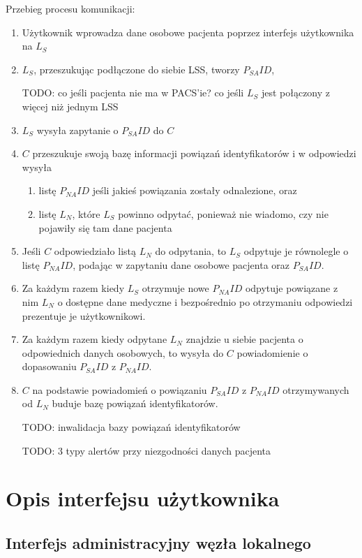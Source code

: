 \documentclass[a4paper]{report}
\begin{document}
Przebieg procesu komunikacji:
\begin{enumerate}
  \item Użytkownik wprowadza dane osobowe pacjenta poprzez interfejs użytkownika na $L_S$
  \item $L_S$, przeszukując podłączone do siebie LSS, tworzy $P_{SA}ID$,

  TODO: co jeśli pacjenta nie ma w PACS'ie? co jeśli $L_S$ jest połączony z więcej niż jednym LSS
  
  \item $L_S$ wysyła zapytanie o $P_{SA}ID$ do $C$
  \item $C$ przeszukuje swoją bazę informacji powiązań identyfikatorów i w odpowiedzi wysyła
    \begin{enumerate}
      \item listę $P_{NA}ID$ jeśli jakieś powiązania zostały odnalezione, oraz
      \item listę $L_N$, które $L_S$ powinno odpytać, ponieważ nie wiadomo, czy nie pojawiły się tam dane pacjenta
    \end{enumerate}
  \item Jeśli $C$ odpowiedziało listą $L_N$ do odpytania, to $L_S$ odpytuje je równolegle o listę $P_{NA}ID$,
  podając w zapytaniu dane osobowe pacjenta oraz $P_{SA}ID$.
  \item Za każdym razem kiedy $L_S$ otrzymuje nowe $P_{NA}ID$ odpytuje powiązane z nim $L_N$ o dostępne dane medyczne i bezpośrednio
  po otrzymaniu odpowiedzi prezentuje je użytkownikowi.
  \item Za każdym razem kiedy odpytane $L_N$ znajdzie u siebie pacjenta o odpowiednich danych osobowych, to wysyła do $C$ powiadomienie
  o dopasowaniu $P_{SA}ID$ z $P_{NA}ID$.
  \item $C$ na podstawie powiadomień o powiązaniu $P_{SA}ID$ z $P_{NA}ID$ otrzymywanych od $L_N$ buduje bazę powiązań identyfikatorów.

TODO: inwalidacja bazy powiązań identyfikatorów

TODO: 3 typy alertów przy niezgodności danych pacjenta

\end{enumerate}



\section{Opis interfejsu użytkownika}


\subsection{Interfejs administracyjny węzła lokalnego}
\end{document}
